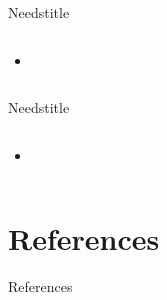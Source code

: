\documentclass{beamer}
\begin{document}
\begin{frame}{Needstitle}
\begin{columns}
\begin{column}{6cm}
\begin{itemize}
	\item 
\end{itemize}
\end{column}
\begin{column}{4cm}
\end{column}
\end{columns}
\end{frame}

\begin{frame}{Needstitle}
\begin{columns}
\begin{column}{6cm}
\begin{itemize}
	\item 
\end{itemize}
\end{column}
\begin{column}{4cm}
\end{column}
\end{columns}
\end{frame}

\section{References}

\begin{frame}[allowframebreaks]{References}


\end{frame}
\end{document}
